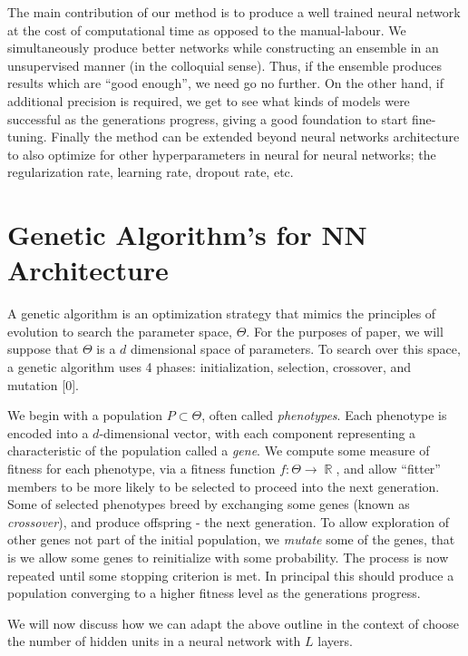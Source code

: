 \documentclass{article}
\DeclareMathOperator{\R}{\mathbb{R}}
\DeclareMathOperator{\1}{\mathbbm{1}}
\begin{document}
The main contribution of our method
is to produce a well trained neural network at the cost of computational time as opposed to the manual-labour.
We simultaneously produce better networks while constructing an ensemble in an unsupervised manner
(in the colloquial sense). Thus, if the ensemble produces results which are ``good enough'', we need go no further.
On the other hand, if additional precision is required, we get to see what kinds of models were successful as the generations progress, 
giving a good foundation to start fine-tuning. Finally the method can be extended beyond neural networks architecture
to also optimize for other hyperparameters in neural for neural networks; the regularization rate, learning rate, dropout rate, etc.


\section{Genetic Algorithm's for NN Architecture}
A genetic algorithm is an optimization strategy that mimics the principles
of evolution to search the parameter space, $\Theta$. For the purposes of paper, 
we will suppose that $\Theta$ is a $d$ dimensional space of parameters. To search over this space,
a genetic algorithm uses 4 phases: initialization, selection, crossover, and mutation [0].

We begin with a population $P\subset \Theta$, often called \emph{phenotypes}.
Each phenotype is encoded into a $d$-dimensional vector, with each component representing a characteristic of the population
called a \emph{gene}. We compute some measure of fitness for each phenotype, via a fitness function
$f:\Theta\rightarrow\R$, and allow ``fitter'' members to be more likely to be selected to proceed into the next generation. 
Some of selected phenotypes breed by exchanging some genes (known as \emph{crossover}),
and produce offspring - the next generation. To allow exploration of other genes not part of the initial population,
we \emph{mutate} some of the genes, that is we allow some genes to reinitialize with some probability.  
The process is now repeated until some stopping criterion is met.  In principal this should produce a population converging
to a higher fitness level as the generations progress. 

We will now discuss how we can adapt the above outline in the context of choose the number of hidden units in a neural network
with $L$ layers. 
\end{document}
